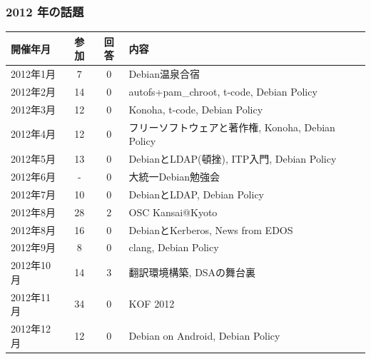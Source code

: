 \documentclass[cjk,dvipdfmx,10pt,compress,%
hyperref={bookmarks=true,bookmarksnumbered=true,bookmarksopen=false,%
colorlinks=false,%
pdftitle={第 121 回 関西 Debian 勉強会},%
pdfauthor={倉敷・のがた・佐々木・かわだ},%
pdfsubject={資料},%
}]{beamer}
\begin{document}
\begin{frame}[fragile]
  \frametitle{2012 年の話題}
    \begin{table}
        \begin{center}
          \begin{tabular}{|l|c|c|p{20em}|}
            \hline
            開催年月  & 参加 & 回答 & 内容 \\
            \hline
            2012年1月 & 7    &0     & Debian温泉合宿 \\
            2012年2月 &14    &0     & autofs+pam\_chroot, t-code, Debian Policy \\
            2012年3月 &12    &0     & Konoha, t-code, Debian Policy \\
            2012年4月 &12    &0     & フリーソフトウェアと著作権, Konoha, Debian Policy \\
            2012年5月 &13    &0     & DebianとLDAP(頓挫), ITP入門, Debian Policy \\
            2012年6月 & -    &0     & 大統一Debian勉強会 \\
            2012年7月 &10    &0     & DebianとLDAP, Debian Policy \\
            2012年8月 &28    &2     & OSC Kansai@Kyoto \\
            2012年8月 &16    &0     & DebianとKerberos, News from EDOS \\
            2012年9月 & 8    &0     & clang, Debian Policy \\
            2012年10月&14    &3     & 翻訳環境構築, DSAの舞台裏\\
            2012年11月&34    &0     & KOF 2012\\
            2012年12月&12    &0     & Debian on Android, Debian Policy \\
            \hline
          \end{tabular}
        \end{center}
    \end{table}
\end{frame}
\end{document}
